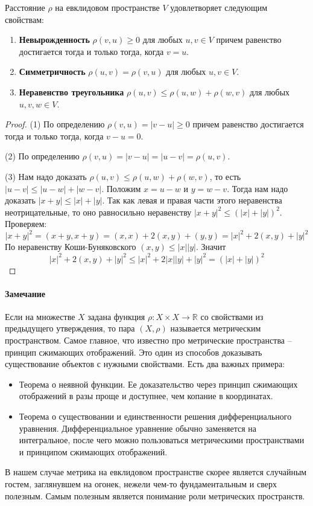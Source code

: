 \begin{claim}
Расстояние $\rho$ на евклидовом пространстве $V$ удовлетворяет следующим свойствам:
\begin{enumerate}
\item {\bf Невырожденность} $\rho(v,u) \geqslant 0$ для любых $u,v\in V$ причем равенство достигается тогда и только тогда, когда $v = u$.

\item {\bf Симметричность} $\rho(u,v) = \rho(v,u)$ для любых $u,v\in V$.

\item {\bf Неравенство треугольника} $\rho(u,v)\leqslant \rho(u,w) + \rho(w,v)$ для любых $u,v,w\in V$.
\end{enumerate}
\end{claim}
\begin{proof}
(1) По определению $\rho(v,u) = |v-u| \geqslant 0$ причем равенство достигается тогда и только тогда, когда $v - u = 0$.

(2) По определению $\rho(v, u) = |v - u| = |u-v| = \rho(u,v)$.

(3) Нам надо доказать $\rho(u,v)\leqslant \rho(u,w) + \rho(w,v)$, то есть $|u-v|\leqslant |u-w| + |w - v|$.
Положим $x = u - w$ и $y = w - v$.
Тогда нам надо доказать $|x + y|\leqslant |x| + |y|$.
Так как левая и правая части этого неравенства неотрицательные, то оно равносильно неравенству $|x+y|^2\leqslant (|x| + |y|)^2$.
Проверяем:
\[
|x+y|^2 = (x+y, x+y) = (x, x) + 2(x, y) + (y,y) = |x|^2 + 2 (x, y) + |y|^2
\]
По неравенству Коши-Буняковского $(x, y)\leqslant |x| |y|$.
Значит
\[
|x|^2 + 2 (x, y) + |y|^2\leqslant |x|^2 + 2|x||y| + |y|^2= (|x|+|y|)^2
\]
\end{proof}

\paragraph{Замечание}

Если на множестве $X$ задана функция $\rho\colon X\times X\to \mathbb R$ со свойствами из предыдущего утверждения, то пара $(X,\rho)$ называется метрическим пространством.
Самое главное, что известно про метрические пространства -- принцип сжимающих отображений.
Это один из способов доказывать существование объектов с  нужными свойствами.
Есть два важных примера:
\begin{itemize}
\item Теорема о неявной функции.
Ее доказательство через принцип сжимающих отображений в разы проще и доступнее, чем копание в координатах.

\item Теорема о существовании и единственности решения дифференциального уравнения.
Дифференциальное уравнение обычно заменяется на интегральное, после чего можно пользоваться метрическими пространствами и принципом сжимающих отображений.
\end{itemize}
В нашем случае метрика на евклидовом пространстве скорее является случайным гостем, заглянувшем на огонек, нежели чем-то фундаментальным и сверх полезным.
Самым полезным является понимание роли метрических пространств.

